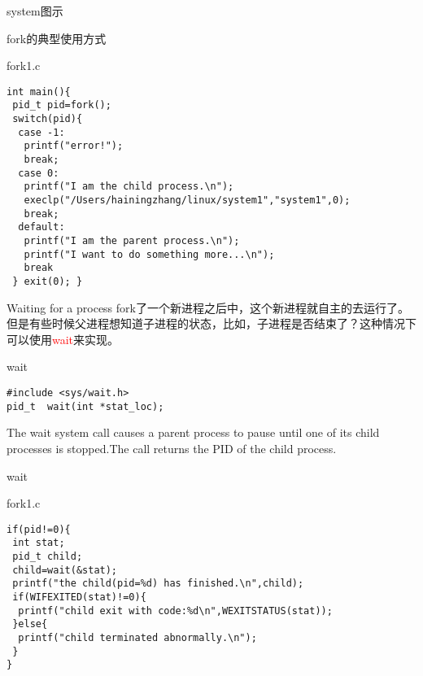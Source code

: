 \documentclass{beamer}
\begin{document}
\begin{frame}{system图示}
\end{frame}


\begin{frame}[fragile]{fork的典型使用方式}
\begin{block}{fork1.c }
\begin{verbatim}
int main(){
 pid_t pid=fork();
 switch(pid){
  case -1:
   printf("error!");
   break;
  case 0:
   printf("I am the child process.\n");
   execlp("/Users/hainingzhang/linux/system1","system1",0);
   break;
  default:
   printf("I am the parent process.\n");
   printf("I want to do something more...\n");
   break		
 } exit(0); }
\end{verbatim}
\end{block}
\end{frame}
\begin{frame}[fragile]{Waiting for a process}
fork了一个新进程之后中，这个新进程就自主的去运行了。但是有些时候父进程想知道子进程的状态，比如，子进程是否结束了？这种情况下可以使用\textcolor{red}{wait}来实现。
\begin{block}{wait}
\begin{verbatim}
#include <sys/wait.h>
pid_t  wait(int *stat_loc);
\end{verbatim}
\end{block}
The wait system call causes a parent process to pause until one of its child processes is stopped.The call returns the PID of the child process.
\end{frame}
\begin{frame}[fragile]{wait}
\begin{block}{fork1.c}
\begin{verbatim}
if(pid!=0){
 int stat;
 pid_t child;
 child=wait(&stat); 
 printf("the child(pid=%d) has finished.\n",child);
 if(WIFEXITED(stat)!=0){
  printf("child exit with code:%d\n",WEXITSTATUS(stat));
 }else{
  printf("child terminated abnormally.\n");
 }
}

\end{verbatim}
\end{block}
\end{frame}
\end{document}
